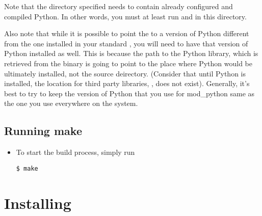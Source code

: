 \begin{itemize}
Note that the directory specified needs to contain already configured and
compiled Python. In other words, you must at least run  and
 in this directory.

Also note that while it is possible to point the
 to a version of Python different from the
one installed in your standard , you will need to have
that version of Python installed as well.  This is because the path to
the Python library, which is retrieved from the  binary
is going to point to the place where Python would be ultimately
installed, not the source deirectory. (Consider that until Python is
installed, the location for third party libraries,
, does not exist). Generally, it's best to try
to keep the version of Python that you use for mod_python same as the
one you use everywhere on the system.

\end{itemize}

\subsection{Running make\label{inst-make}}

\begin{itemize}

\item
To start the build process, simply run
\begin{verbatim}
$ make
\end{verbatim}



\end{itemize}

\section{Installing\label{inst-installing}}

